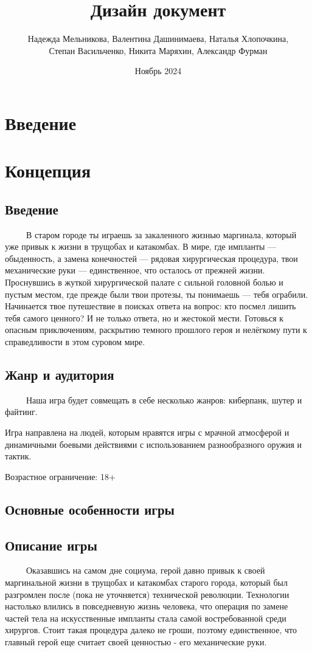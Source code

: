 \documentclass{article}
\title{Дизайн документ}
\author{Надежда Мельникова, Валентина Дашинимаева, Наталья Хлопочкина, \\
Степан Васильченко, Никита Маряхин, Александр Фурман}
\date{Ноябрь 2024}
\begin{document}
\maketitle
\renewcommand{\contentsname}{Оглавление}
\tableofcontents

\section{Введение}

\section{Концепция}

\subsection{Введение}
\ \ \ \ \ В старом городе ты играешь за закаленного жизнью маргинала, который уже привык к жизни в трущобах и катакомбах. В мире, где импланты — обыденность, а замена конечностей — рядовая хирургическая процедура, твои механические руки — единственное, что осталось от прежней жизни. Проснувшись в жуткой хирургической палате с сильной головной болью и пустым местом, где прежде были твои протезы, ты понимаешь — тебя ограбили. Начинается твое путешествие в поисках ответа на вопрос: кто посмел лишить тебя самого ценного? И не только ответа, но и жестокой мести. Готовься к опасным приключениям, раскрытию темного прошлого героя и нелёгкому пути к справедливости в этом суровом мире.
\subsection{Жанр и аудитория}
\ \ \ \ \ Наша игра будет совмещать в себе несколько жанров: киберпанк, шутер и файтинг.

Игра направлена на людей, которым нравятся игры с  мрачной атмосферой и динамичными боевыми действиями с использованием разнообразного оружия и тактик. 

Возрастное ограничение: 18+
\subsection{Основные особенности игры}

\subsection{Описание игры}
\ \ \ \ \ Оказавшись на самом дне социума, герой давно привык к своей маргинальной
жизни в трущобах и катакомбах старого города, который был разгромлен после (пока не
уточняется) технической революции. Технологии настолько влились в повседневную жизнь
человека, что операция по замене частей тела на искусственные импланты стала самой
востребованной среди хирургов. Стоит такая процедура далеко не гроши, поэтому
единственное, что главный герой еще считает своей ценностью - его механические руки.
\end{document}
